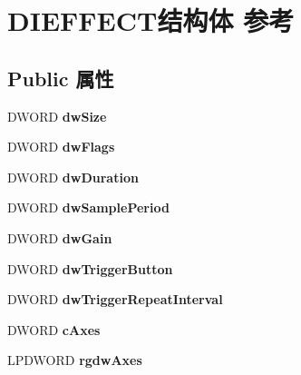 \hypertarget{struct_d_i_e_f_f_e_c_t}{}\section{D\+I\+E\+F\+F\+E\+C\+T结构体 参考}
\label{struct_d_i_e_f_f_e_c_t}
\subsection*{Public 属性}
\begin{DoxyCompactItemize}
\item 
\mbox{\label{struct_d_i_e_f_f_e_c_t_a68d18ada8d43539e914e920bac27c984}} 
D\+W\+O\+RD {\bfseries dw\+Size}
\item 
\mbox{\label{struct_d_i_e_f_f_e_c_t_a5f2d4058dad3d3e6ef6bf546bb037c2c}} 
D\+W\+O\+RD {\bfseries dw\+Flags}
\item 
\mbox{\label{struct_d_i_e_f_f_e_c_t_a2e8a7e3dbf7f30ade92c1c07c35d3c19}} 
D\+W\+O\+RD {\bfseries dw\+Duration}
\item 
\mbox{\label{struct_d_i_e_f_f_e_c_t_ad145c3ac19a4086fdc397a0226eea5b1}} 
D\+W\+O\+RD {\bfseries dw\+Sample\+Period}
\item 
\mbox{\label{struct_d_i_e_f_f_e_c_t_a32a100619fcd374b63f6ab70d9b72eb6}} 
D\+W\+O\+RD {\bfseries dw\+Gain}
\item 
\mbox{\label{struct_d_i_e_f_f_e_c_t_a1283ada33ce85bfdb25af7eff8154d8d}} 
D\+W\+O\+RD {\bfseries dw\+Trigger\+Button}
\item 
\mbox{\label{struct_d_i_e_f_f_e_c_t_a616457fa90119a184cb4800ea1a21816}} 
D\+W\+O\+RD {\bfseries dw\+Trigger\+Repeat\+Interval}
\item 
\mbox{\label{struct_d_i_e_f_f_e_c_t_a0b663ab30264a07c2a6dea7599fd324f}} 
D\+W\+O\+RD {\bfseries c\+Axes}
\item 
\mbox{\label{struct_d_i_e_f_f_e_c_t_af2d08938130f75e11fac0348abbe1e4e}} 
L\+P\+D\+W\+O\+RD {\bfseries rgdw\+Axes}

\end{DoxyCompactItemize}
